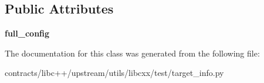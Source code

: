 \subsection*{Public Attributes}
\begin{DoxyCompactItemize}
\item 
\mbox{\label{classlibcxx_1_1test_1_1target__info_1_1_default_target_info_ac13cc23db5265ecf58728fc8a41981bc}} 
{\bfseries full\+\_\+config}
\end{DoxyCompactItemize}


The documentation for this class was generated from the following file\+:\begin{DoxyCompactItemize}
\item 
contracts/libc++/upstream/utils/libcxx/test/target\+\_\+info.\+py\end{DoxyCompactItemize}
